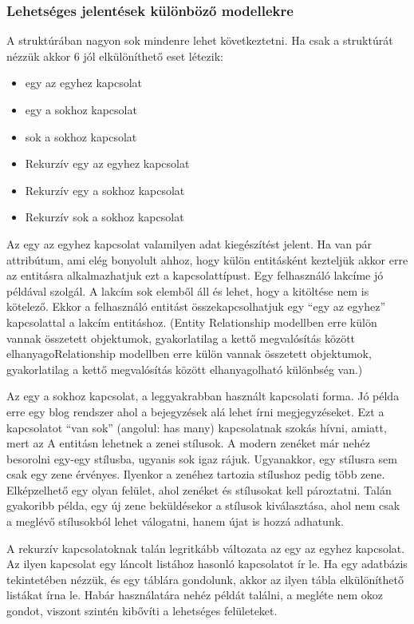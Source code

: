 \documentclass[a4paper,12pt,oneside]{report}
\begin{document}
\subsubsection{Lehetséges jelentések különböző modellekre}
\begin{justify}

	A struktúrában nagyon sok mindenre lehet következtetni. Ha csak a struktúrát nézzük akkor 6 jól elkülöníthető eset létezik:

	\begin{itemize}
		\item egy az egyhez kapcsolat
		\item egy a sokhoz kapcsolat
		\item sok a sokhoz kapcsolat
		\item Rekurzív egy az egyhez kapcsolat
		\item Rekurzív egy a sokhoz kapcsolat
		\item Rekurzív sok a sokhoz kapcsolat
	\end{itemize}

	Az egy az egyhez kapcsolat valamilyen adat kiegészítést jelent. Ha van pár attribútum, ami elég bonyolult ahhoz, hogy külön entitásként kezteljük akkor erre az entitásra alkalmazhatjuk ezt a kapcsolattípust. Egy felhasználó lakcíme jó példával szolgál. A lakcím sok elemből áll és lehet, hogy a kitöltése nem is kötelező. Ekkor a felhasználó entitást összekapcsolhatjuk egy “egy az egyhez” kapcsolattal a lakcím entitáshoz. (Entity Relationship modellben erre külön vannak összetett objektumok, gyakorlatilag a kettő megvalósítás között elhanyagoRelationship modellben erre külön vannak összetett objektumok, gyakorlatilag a kettő megvalósítás között elhanyagolható különbség van.)

	Az egy a sokhoz kapcsolat, a leggyakrabban használt kapcsolati forma. Jó példa erre egy blog rendszer ahol a bejegyzések alá lehet írni megjegyzéseket. Ezt a kapcsolatot “van sok” (angolul: has many) kapcsolatnak szokás hívni, amiatt, mert az A entitásn lehetnek a zenei stílusok. A modern zenéket már nehéz besorolni egy-egy stílusba, ugyanis sok igaz rájuk. Ugyanakkor, egy stílusra sem csak egy zene érvényes. Ilyenkor a zenéhez tartozia stílushoz pedig több zene. Elképzelhető egy olyan felület, ahol zenéket és stílusokat kell pároztatni. Talán gyakoribb példa, egy új zene beküldésekor a stílusok kiválasztása, ahol nem csak a meglévő stílusokból lehet válogatni, hanem újat is hozzá adhatunk.

	A rekurzív kapcsolatoknak talán legritkább változata az egy az egyhez kapcsolat. Az ilyen kapcsolat egy láncolt listához hasonló kapcsolatot ír le. Ha egy adatbázis tekintetében nézzük, és egy táblára gondolunk, akkor az ilyen tábla elkülöníthető listákat írna le. Habár használatára nehéz példát találni, a megléte nem okoz gondot, viszont szintén kibővíti a lehetséges felületeket. 


\end{justify}
\end{document}
